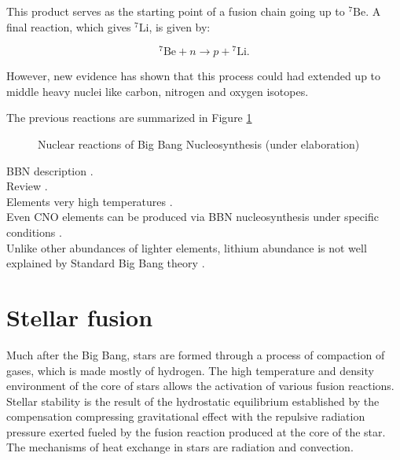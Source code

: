 \documentclass[openany]{book}
\begin{document}
 This product serves as the starting point of a fusion chain going up to $\mathrm{{}^{7}Be}$. A final reaction, which gives $\mathrm{{}^{7}Li}$, is given by: 
 
 \begin{equation} \label{eq:reaction_7Ben}
 	\mathrm{{}^{7}Be} + n \rightarrow p + \mathrm{{}^{7}Li}.
 \end{equation}
 
 However, new evidence has shown that this process could had extended up to middle heavy nuclei like carbon, nitrogen and oxygen isotopes.

The previous reactions are summarized in Figure \ref{fig:nuclearReactionsBNN}

\begin{figure}[H]
	
	\caption[Nuclear reactions of Big Bang Nucleosynthesis]{Nuclear reactions of Big Bang Nucleosynthesis (under elaboration)}
	\label{fig:nuclearReactionsBNN}
\end{figure}


BBN description \cite{coc_vangioni_2010}. \\

Review \cite{patrignani_et_particle-data-group_2016}. \\

Elements very high temperatures \cite{wagoner_fowler_hoyle_1967}. \\

Even CNO elements can be produced via BBN nucleosynthesis under specific conditions \cite{su-qing_kai-su_yong-shou_neng-chuan_zhi-hong_2010}.\\

Unlike other abundances of lighter elements, lithium abundance is not well explained by Standard Big Bang theory \cite{bertulani_2019}. 


\section{Stellar fusion}  \label{sec:StellarFusion}

Much after the Big Bang, stars are formed through a process of compaction of gases, which is made mostly of hydrogen. The high temperature and density environment of the core of stars allows the activation of various fusion reactions.  \\

Stellar stability is the result of the hydrostatic equilibrium established by the compensation compressing gravitational effect with the repulsive radiation pressure exerted fueled by the fusion reaction produced at the core of the star. The mechanisms of heat exchange in stars are radiation and convection. \\
\end{document}
